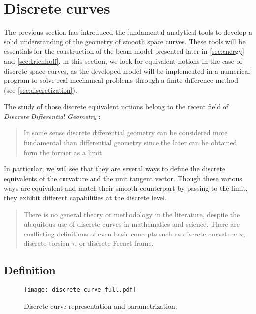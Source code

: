 \section{Discrete curves}

The previous section has introduced the fundamental analytical tools to develop a solid understanding of the geometry of smooth space curves. These tools will be essentials for the construction of the beam model presented later in \cref{sec:energy} and \cref{sec:krichhoff}. In this section, we look for equivalent notions in the case of discrete space curves, as the developed model will be implemented in a numerical program to solve real mechanical problems through a finite-difference method (see \cref{sec:discretization}).

The study of those discrete equivalent notions belong to the recent field of \emph{Discrete Differential Geometry} : \blockcquote[p.7]{Hoffmann2008}{In some sense discrete differential geometry can be considered more fundamental than differential geometry since the later can be obtained form the former as a limit}. In particular, we will see that they are several ways to define the discrete equivalents of the curvature and the unit tangent vector. Though these various ways are equivalent and match their smooth counterpart by passing to the limit, they exhibit different capabilities at the discrete level.

 \blockcquote[p.1]{Carroll2014}{There is no general theory or methodology in the literature, despite the ubiquitous use of discrete curves in mathematics and science. There are conflicting definitions of even basic concepts such as discrete curvature $\kappa$, discrete torsion $\tau$, or discrete Frenet frame.}.


\subsection{Definition}
\begin{figure}[t]
	\centering
	\texttt{[image: discrete\_curve\_full.pdf]}
	\caption{Discrete curve representation and parametrization.}
	\label{fig:discrete_curve}
\end{figure}

